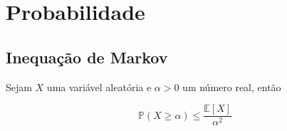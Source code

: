 \chapter{Probabilidade}
\label{ap:probability}

\section{Inequação de Markov}
\label{ap:markov}

Sejam $X$ uma variável aleatória e $\alpha > 0$ um número real, então

\[ \mathbb{P}(X \geq \alpha) \leq \frac{\mathbb{E}[X]}{\alpha^2}\]